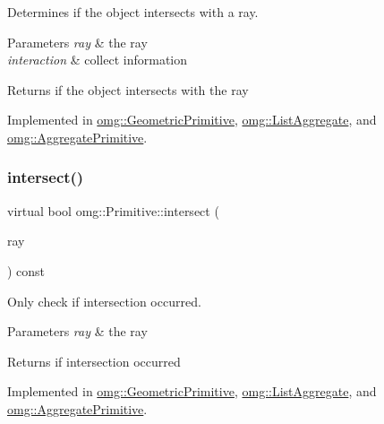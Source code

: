 Determines if the object intersects with a ray. 


\begin{DoxyParams}{Parameters}
{\em ray} & the ray \\
\hline
{\em interaction} & collect information \\
\hline
\end{DoxyParams}
\begin{DoxyReturn}{Returns}
if the object intersects with the ray 
\end{DoxyReturn}


Implemented in \mbox{\hyperlink{classomg_1_1_geometric_primitive_a21bc48f971cbc94b60791906f20bc925}{omg\+::\+Geometric\+Primitive}}, \mbox{\hyperlink{classomg_1_1_list_aggregate_a55fdd3b0fa387cb14488b86634b3e877}{omg\+::\+List\+Aggregate}}, and \mbox{\hyperlink{classomg_1_1_aggregate_primitive_a07ab041d9071295e4f648475c7163470}{omg\+::\+Aggregate\+Primitive}}.

\mbox{\label{classomg_1_1_primitive_a139c012a57ad2322c5bef078b5d7e653}} 
\subsubsection{\texorpdfstring{intersect()}{intersect()}\hspace{0.1cm}{\footnotesize\ttfamily [2/2]}}
{\footnotesize\ttfamily virtual bool omg\+::\+Primitive\+::intersect (\begin{DoxyParamCaption}\item[{const \mbox{\hyperlink{classomg_1_1_ray}{Ray}} \&}]{ray }\end{DoxyParamCaption}) const\hspace{0.3cm}{\ttfamily [pure virtual]}}



Only check if intersection occurred. 


\begin{DoxyParams}{Parameters}
{\em ray} & the ray \\
\hline
\end{DoxyParams}
\begin{DoxyReturn}{Returns}
if intersection occurred 
\end{DoxyReturn}


Implemented in \mbox{\hyperlink{classomg_1_1_geometric_primitive_a797a2eb74fb48a7e25c7f98f16c604a7}{omg\+::\+Geometric\+Primitive}}, \mbox{\hyperlink{classomg_1_1_list_aggregate_ac3abd78ca5ce87eb3821bf19bf5194cf}{omg\+::\+List\+Aggregate}}, and \mbox{\hyperlink{classomg_1_1_aggregate_primitive_af6009e1c54b0f2341d78d95afb4268cc}{omg\+::\+Aggregate\+Primitive}}.

